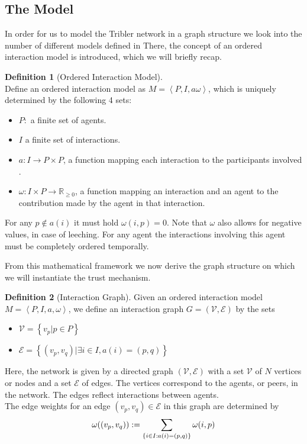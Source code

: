 \documentclass[sigconf]{acmart}
\theoremstyle{definition}
\newtheorem{definition}{Definition}[section]
\begin{document}
\subsection{The Model}
\label{subsec:TheModel}
In order for us to model the Tribler network in a graph structure we look into the number of different models defined in \citep{Sybil-resistant trust mechanisms in distributed systems} There, the concept of an ordered interaction model is introduced, which we will briefly recap.
\begin{definition}[Ordered Interaction Model]\ \\
Define an ordered interaction model as $M=\left\langle P,I,a\omega\right\rangle$, which is uniquely determined by the following 4 sets:
\begin{itemize}
\item $P:$ a finite set of agents.
\item $I$ a finite set of interactions.
\item $a:I\rightarrow{}P\times{}P$, a function mapping each interaction to the participants involved .
\item $\omega:I\times{}P\rightarrow{}\mathbb{R}_{\geq{}0}$, a function mapping an interaction and an agent to the contribution made by the agent in that interaction. \\
\end{itemize}
For any $p\not\in{}a(i)$ it must hold $\omega{}(i,p)=0$. Note that $\omega$ also allows for negative values, in case of leeching. For any agent the interactions involving this agent must be completely ordered temporally. 
\end{definition}
From this mathematical framework we now derive the graph structure on which we will instantiate the trust mechanism. 
\begin{definition}[Interaction Graph]
Given an ordered interaction model $M=\left\langle P,I,a,\omega\right\rangle$, we define an interaction graph $G = (\mathcal{V}, \mathcal{E})$ by the sets
\begin{itemize}
\item $\mathcal{V}=\left\lbrace v_p | p\in{}P\right\rbrace$
\item $\mathcal{E}=\left\lbrace (v_p,v_q) | \exists i\in I, a(i)=(p,q) \right\rbrace$ \vspace{1em}\\
\end{itemize}
Here, the network is given by a directed graph $(\mathcal{V}, \mathcal{E})$ with a set $\mathcal{V}$ of $N$ vertices or nodes and a set $\mathcal{E}$ of edges. The vertices correspond to the agents, or peers, in the network. The edges reflect interactions between agents.\vspace{1em}\\
The edge weights for an edge $(v_p,v_q)\in\mathcal{E}$ in this graph are determined by \vspace{0.3em}\\
\[ 
\omega((v_p, v_q)):=\sum_{\left\lbrace i\in I:a(i)=(p,q)\right\rbrace}\omega(i,p) \vspace{0.6em}\\
\]
\end{definition}
\end{document}
